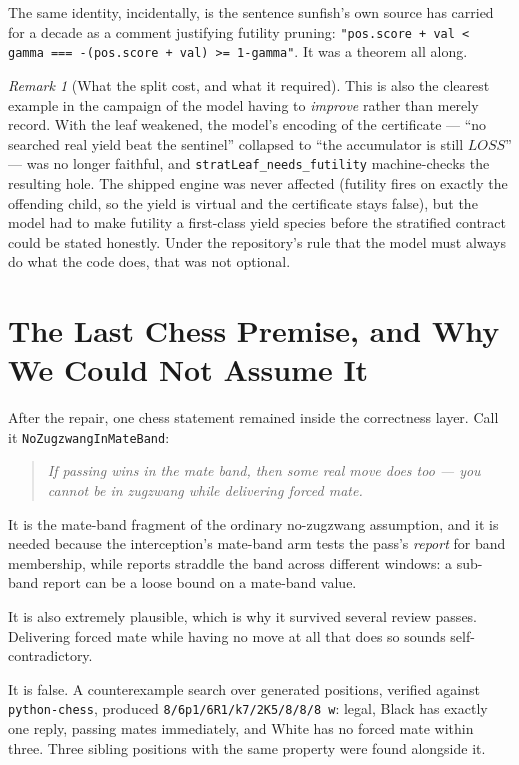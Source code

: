 \documentclass[11pt]{article}
\newcommand{\LOSS}{\mathit{LOSS}}   %
\theoremstyle{plain}
\theoremstyle{definition}
\theoremstyle{remark}
\newtheorem{remark}[theorem]{Remark}
\begin{document}
The same identity, incidentally, is the sentence sunfish's own source
has carried for a decade as a comment justifying futility pruning:
\texttt{"pos.score + val < gamma === -(pos.score + val) >= 1-gamma"}.
It was a theorem all along.

\begin{remark}[What the split cost, and what it required]
This is also the clearest example in the campaign of the model having
to \emph{improve} rather than merely record.  With the leaf weakened,
the model's encoding of the certificate --- ``no searched real yield
beat the sentinel'' collapsed to ``the accumulator is still $\LOSS$''
--- was no longer faithful, and \texttt{stratLeaf\_needs\_futility}
machine-checks the resulting hole.  The shipped engine was never
affected (futility fires on exactly the offending child, so the yield
is virtual and the certificate stays false), but the model had to make
futility a first-class yield species before the stratified contract
could be stated honestly.  Under the repository's rule that the model
must always do what the code does, that was not optional.
\end{remark}

\section{The Last Chess Premise, and Why We Could Not Assume It}
\label{sec:bandedge}

After the repair, one chess statement remained inside the correctness
layer.  Call it \texttt{NoZugzwangInMateBand}:

\begin{quote}
\emph{If passing wins in the mate band, then some real move does too
--- you cannot be in zugzwang while delivering forced mate.}
\end{quote}

It is the mate-band fragment of the ordinary no-zugzwang assumption,
and it is needed because the interception's mate-band arm tests the
pass's \emph{report} for band membership, while reports straddle the
band across different windows: a sub-band report can be a loose bound
on a mate-band value.

It is also extremely plausible, which is why it survived several review
passes.  Delivering forced mate while having no move at all that does
so sounds self-contradictory.

It is false.  A counterexample search over generated positions,
verified against \texttt{python-chess}, produced
\texttt{8/6p1/6R1/k7/2K5/8/8/8 w}: legal, Black has exactly one reply,
passing mates immediately, and White has no forced mate within three.
Three sibling positions with the same property were found alongside it.
\end{document}
